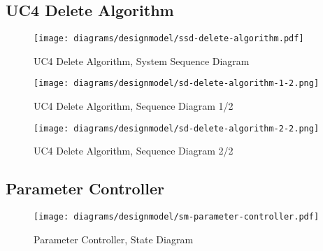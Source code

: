 \subsection{UC4 Delete Algorithm}
\begin{figure}[H]
    \centering
    \texttt{[image: diagrams/designmodel/ssd-delete-algorithm.pdf]}
    \caption{UC4 Delete Algorithm, System Sequence Diagram}
    \label{fig:delete-algorithm-ssd}
\end{figure}
\begin{figure}[p]%
  \begin{leftfullpage}
    \texttt{[image: diagrams/designmodel/sd-delete-algorithm-1-2.png]}
    \caption{UC4 Delete Algorithm, Sequence Diagram 1/2}
    \label{fig:delete-algorithm-sd-1}
  \end{leftfullpage}
\end{figure}
\begin{figure}[p]%
  \begin{fullpage}
    \texttt{[image: diagrams/designmodel/sd-delete-algorithm-2-2.png]}
    \caption{UC4 Delete Algorithm, Sequence Diagram 2/2}
    \label{fig:delete-algorithm-sd-2}
  \end{fullpage}
\end{figure}
% 
\subsection{Parameter Controller}
\begin{figure}[H]
    \centering
    \texttt{[image: diagrams/designmodel/sm-parameter-controller.pdf]}
    \caption{Parameter Controller, State Diagram}
    \label{fig:parameter-controller-sm}
\end{figure}
% 
